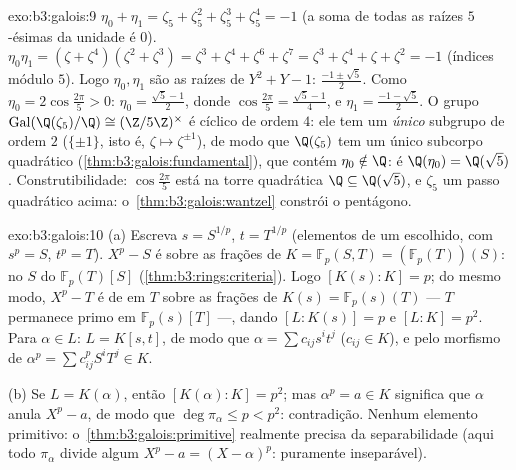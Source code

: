 \begin{solution}{exo:b3:galois:9}
$\eta_0 + \eta_1 = \zeta_5 + \zeta_5^2 + \zeta_5^3 + \zeta_5^4 =
-1$ (a soma de todas as raízes $5$-ésimas da unidade é $0$). $\eta_0\eta_1 =
(\zeta + \zeta^4)(\zeta^2 + \zeta^3) = \zeta^3 + \zeta^4 +
\zeta^6 + \zeta^7 = \zeta^3 + \zeta^4 + \zeta + \zeta^2 = -1$
(índices módulo $5$). Logo $\eta_0, \eta_1$ são as raízes de $Y^2 + Y
- 1$: $\frac{-1 \pm \sqrt5}2$. Como $\eta_0 =
2\cos\frac{2\pi}5 > 0$: $\eta_0 = \frac{\sqrt5 - 1}2$, donde
$\cos\frac{2\pi}5 = \frac{\sqrt5 - 1}4$, e $\eta_1 =
\frac{-1-\sqrt5}2$. O grupo
$\operatorname{Gal}(\Q(\zeta_5)/\Q) \cong (\Z/5\Z)^\times$ é
cíclico de ordem $4$: ele tem um \emph{único} subgrupo de ordem
$2$ ($\{\pm 1\}$, isto é, $\zeta \mapsto \zeta^{\pm1}$), de modo que
$\Q(\zeta_5)$ tem um único subcorpo quadrático
(\cref{thm:b3:galois:fundamental}), que contém $\eta_0
\notin \Q$: é $\Q(\eta_0) = \Q(\sqrt5)$. Construtibilidade:
$\cos\frac{2\pi}5$ está na torre quadrática $\Q \subseteq
\Q(\sqrt5)$, e $\zeta_5$ um passo quadrático acima:
o~\cref{thm:b3:galois:wantzel} constrói o pentágono.
\end{solution}

\begin{solution}{exo:b3:galois:10}
(a) Escreva $s = S^{1/p}$, $t = T^{1/p}$ (elementos de um  escolhido, com $s^p = S$, $t^p = T$). $X^p - S$ é
 sobre as frações de $K = \mathbb F_p(S, T) = (\mathbb
F_p(T))(S)$:  no  $S$ do
 $\mathbb F_p(T)[S]$ (\cref{thm:b3:rings:criteria}). Logo
$[K(s):K] = p$; do mesmo modo, $X^p - T$ é de  em $T$ sobre
as frações de $K(s) = \mathbb F_p(s)(T)$ --- $T$ permanece primo em
$\mathbb F_p(s)[T]$ ---, dando $[L : K(s)] = p$ e $[L:K] =
p^2$. Para $\alpha \in L$: $L = K[s, t]$, de modo que $\alpha = \sum
c_{ij}s^it^j$ ($c_{ij} \in K$), e pelo morfismo de 
$\alpha^p = \sum c_{ij}^p S^iT^j \in K$.

(b) Se $L = K(\alpha)$, então $[K(\alpha):K] = p^2$; mas
$\alpha^p = a \in K$ significa que $\alpha$ anula $X^p - a$, de modo que
$\deg\pi_\alpha \leq p < p^2$: contradição. Nenhum elemento
primitivo: o~\cref{thm:b3:galois:primitive} realmente precisa da
separabilidade (aqui todo $\pi_\alpha$ divide algum $X^p - a =
(X - \alpha)^p$: puramente inseparável).
\end{solution}

